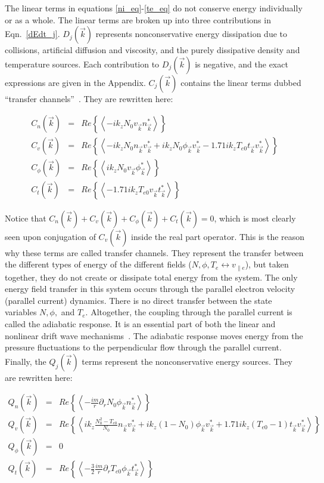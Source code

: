 \documentclass[showpacs,preprintnumbers,amsmath,amssymb,superscriptaddress,aip]{revtex4-1}
\def\beqar{\begin{eqnarray}}
\def\eeqar{\end{eqnarray}}
\def\para{\parallel}
\newcommand{\pdr}{\partial_r}
\begin{document}
The linear terms in equations \ref{ni_eq}-\ref{te_eq} do not conserve energy individually or as a whole. The linear terms are broken up into three contributions in Eqn.~\ref{dEdt_j}.
$D_{j}(\vec{k})$ represents nonconservative energy dissipation due to collisions, artificial diffusion and viscosity, and the purely dissipative density and temperature sources.
Each contribution to $D_j(\vec{k})$ is negative, and the exact expressions are given in the Appendix. 
$C_j(\vec{k})$ contains the linear terms dubbed ``transfer channels''~\cite{scott2002}. They are rewritten here:

\beqar
C_n(\vec{k}) & = & Re \left\{ \left< - i k_z N_0 v_{\vec{k}} n_{\vec{k}}^* \right> \right\}
\label{Cnk} \\
C_v(\vec{k}) & = & Re \left\{ \left< - i k_z N_0 n_{\vec{k}} v_{\vec{k}}^* + i k_z N_0 \phi_{\vec{k}} v_{\vec{k}}^*  - 1.71 i k_z T_{e0} t_{\vec{k}} v_{\vec{k}}^*  \right> \right\}
\label{Cvk} \\
C_\phi(\vec{k}) & = & Re \left\{ \left< i k_z N_0 v_{\vec{k}} \phi_{\vec{k}}^* \right> \right\}
\label{Cpk} \\
C_t(\vec{k}) & = & Re \left\{ \left< - 1.71 i k_z T_{e0} v_{\vec{k}} t_{\vec{k}}^* \right> \right\}
\label{Ctk}
\eeqar

Notice that $C_n(\vec{k}) + C_v(\vec{k}) + C_\phi(\vec{k}) + C_t(\vec{k}) = 0$, which is most clearly seen upon conjugation of $C_v(\vec{k})$ inside the real part operator.
This is the reason why these terms are called transfer channels. They represent the transfer
between the different types of energy of the different fields ($N,\phi,T_e \leftrightarrow v_{\para e}$), but taken together, they do not create or dissipate total
energy from the system. The only energy field transfer in this system occurs through the parallel electron velocity (parallel current) dynamics. There is no direct transfer between
the state variables $N, \phi,$ and $T_e$.  Altogether, the coupling through the parallel current is called the
adiabatic response. It is an essential part of both the linear and nonlinear
drift wave mechanisms~\cite{scott2002,scott2005}. The adiabatic response moves energy from the pressure fluctuations to the perpendicular flow through the parallel current. \\

Finally, the $Q_j(\vec{k})$ terms represent the nonconservative energy sources. They are rewritten here:

\beqar
Q_n(\vec{k}) & = & Re \left\{ \left< -\frac{i m}{r} \pdr N_0 \phi_{\vec{k}} n_{\vec{k}}^*  \right> \right\}
\label{Qnk} \\
Q_v(\vec{k}) & = & Re \left\{ \left<  i k_z \frac{N_0^2 - T_{e0}}{N_0} n_{\vec{k}} v_{\vec{k}}^* + i k_z (1 - N_0) \phi_{\vec{k}} v_{\vec{k}}^* + 1.71 i k_z (T_{e0} -1) t_{\vec{k}} v_{\vec{k}}^*  \right> \right\}
\label{Qvk} \\
Q_\phi(\vec{k}) & = & 0
\label{Qpk} \\
Q_t(\vec{k}) & = & Re \left\{ \left< -\frac{3}{2} \frac{i m}{r} \pdr T_{e0} \phi_{\vec{k}} t_{\vec{k}}^*  \right> \right\}
\label{Qtk}
\eeqar
\end{document}
